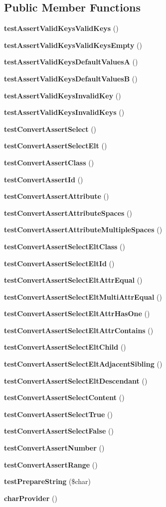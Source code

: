 \subsection*{Public Member Functions}
\begin{DoxyCompactItemize}
\item 
{\bf test\+Assert\+Valid\+Keys\+Valid\+Keys} ()
\item 
{\bf test\+Assert\+Valid\+Keys\+Valid\+Keys\+Empty} ()
\item 
{\bf test\+Assert\+Valid\+Keys\+Default\+Values\+A} ()
\item 
{\bf test\+Assert\+Valid\+Keys\+Default\+Values\+B} ()
\item 
{\bf test\+Assert\+Valid\+Keys\+Invalid\+Key} ()
\item 
{\bf test\+Assert\+Valid\+Keys\+Invalid\+Keys} ()
\item 
{\bf test\+Convert\+Assert\+Select} ()
\item 
{\bf test\+Convert\+Assert\+Select\+Elt} ()
\item 
{\bf test\+Convert\+Assert\+Class} ()
\item 
{\bf test\+Convert\+Assert\+Id} ()
\item 
{\bf test\+Convert\+Assert\+Attribute} ()
\item 
{\bf test\+Convert\+Assert\+Attribute\+Spaces} ()
\item 
{\bf test\+Convert\+Assert\+Attribute\+Multiple\+Spaces} ()
\item 
{\bf test\+Convert\+Assert\+Select\+Elt\+Class} ()
\item 
{\bf test\+Convert\+Assert\+Select\+Elt\+Id} ()
\item 
{\bf test\+Convert\+Assert\+Select\+Elt\+Attr\+Equal} ()
\item 
{\bf test\+Convert\+Assert\+Select\+Elt\+Multi\+Attr\+Equal} ()
\item 
{\bf test\+Convert\+Assert\+Select\+Elt\+Attr\+Has\+One} ()
\item 
{\bf test\+Convert\+Assert\+Select\+Elt\+Attr\+Contains} ()
\item 
{\bf test\+Convert\+Assert\+Select\+Elt\+Child} ()
\item 
{\bf test\+Convert\+Assert\+Select\+Elt\+Adjacent\+Sibling} ()
\item 
{\bf test\+Convert\+Assert\+Select\+Elt\+Descendant} ()
\item 
{\bf test\+Convert\+Assert\+Select\+Content} ()
\item 
{\bf test\+Convert\+Assert\+Select\+True} ()
\item 
{\bf test\+Convert\+Assert\+Select\+False} ()
\item 
{\bf test\+Convert\+Assert\+Number} ()
\item 
{\bf test\+Convert\+Assert\+Range} ()
\item 
{\bf test\+Prepare\+String} (\$char)
\item 
{\bf char\+Provider} ()
\end{DoxyCompactItemize}
